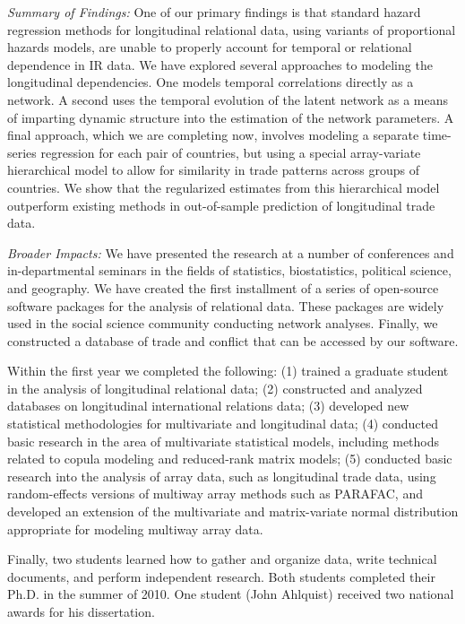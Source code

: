 \documentclass[pdftex,12pt,fullpage,oneside]{amsart}
\begin{document}
\textit{Summary of Findings:} One of our primary findings is that
standard hazard regression methods for longitudinal relational data,
using variants of proportional hazards models, are unable to properly
account for temporal or relational dependence in IR data. We have
explored several approaches to modeling the longitudinal dependencies.
One models temporal correlations directly as a network.  A second uses
the temporal evolution of the latent network as a means of imparting
dynamic structure into the estimation of the network parameters.  A
final approach, which we are completing now, involves modeling a
separate time-series regression for each pair of countries, but using
a special array-variate hierarchical model to allow for similarity in
trade patterns across groups of countries. We show that the
regularized estimates from this hierarchical model outperform existing
methods in out-of-sample prediction of longitudinal trade data.

\textit{Broader Impacts:} We have presented the research at a number
of conferences and in-departmental seminars in the fields of
statistics, biostatistics, political science, and geography. We have
created the first installment of a series of open-source software
packages for the analysis of relational data. These packages are
widely used in the social science community conducting network
analyses. Finally, we constructed a database of trade and conflict
that can be accessed by our software.

Within the first year we completed the following: (1) trained a
graduate student in the analysis of longitudinal relational data; (2)
constructed and analyzed databases on longitudinal international
relations data; (3) developed new statistical methodologies for
multivariate and longitudinal data; (4) conducted basic research in
the area of multivariate statistical models, including methods related
to copula modeling and reduced-rank matrix models; (5) conducted basic
research into the analysis of array data, such as longitudinal trade
data, using random-effects versions of multiway array methods such as
PARAFAC, and developed an extension of the multivariate and
matrix-variate normal distribution appropriate for modeling multiway
array data.

Finally, two students learned how to gather and organize data, write
technical documents, and perform independent research. Both students
completed their Ph.D. in the summer of 2010. One student (John
Ahlquist) received two national awards for his dissertation.
\end{document}

